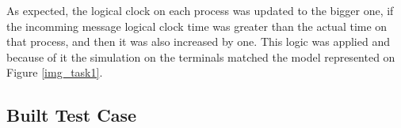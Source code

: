 \documentclass[a4paper, 11pt]{article}
\begin{document}
As expected, the logical clock on each process was updated to the bigger one, if the incomming message logical clock time was greater than the actual time on that process, and then it was also increased by one. This logic was applied and because of it the simulation on the terminals matched the model represented on Figure \ref{img_task1}.

\subsection*{Built Test Case}



% 
% 
\end{document}
